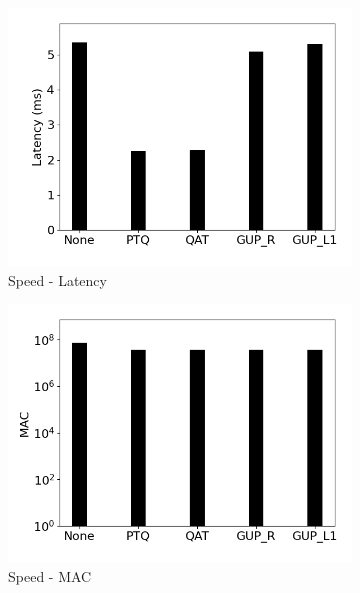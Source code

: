 \begin{figure}[]
\begin{subfigure}{0.19\textwidth}
        \includegraphics[width=1\textwidth]{other/figures/Resnet18_CIFAR10_Laptop/Latency.png}
        \caption{Speed - Latency}
    \end{subfigure}
    \begin{subfigure}{0.19\textwidth}
        \includegraphics[width=1\textwidth]{other/figures/Resnet18_CIFAR10_Laptop/MAC.png}
        \caption{Speed - MAC}
    \end{subfigure}
    \begin{subfigure}{0.19\textwidth}

\end{subfigure}
\end{figure}
